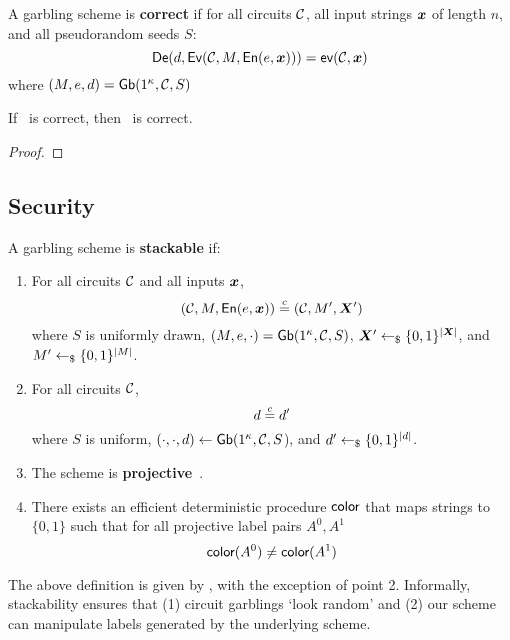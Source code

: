 \begin{definition}[Correctness]\label{def:correct}
  A garbling scheme is \textbf{correct} if for
  all circuits $\mathcal C$,
  all input strings $\cirinp$ of length $n$,
  and all pseudorandom seeds $S$:
  \[
    \gDe(d, \gEv(\cir, \mat,\gEn(e,\cirinp))) = \gev(\cir,\cirinp)
  \]
  where $(M, e, d) = \textsf{Gb}(1^\kappa,\mathcal C,S)$
\end{definition}

\begin{theorem}\label{theorem:correctness}
  If \underscheme\ is correct, then \ourscheme\ is correct.
\end{theorem}
\begin{proof}
\end{proof}

\subsection{Security}

\begin{definition}[Stackability]\label{def:stackable}
  A garbling scheme is \textbf{stackable} if:
  \begin{enumerate}
    \item
      For
      all circuits $\mathcal C$
      and all inputs $\cirinp$,
      \[
        (\cir, \mat, \gEn(e, \cirinp)) \indist (\cir, \mat', \gcirinp')
      \]
      where
      $S$ is uniformly drawn,
      $(M, e, \cdot) = \textsf{Gb}(1^\kappa, \mathcal C, S)$,
      $\gcirinp' \drawnfrom{} \{0, 1\}^{|\gcirinp|}$,
      and $M' \gets_{\$} \{0, 1\}^{|M|}$.
    \item
      For all circuits $\mathcal C$,
      \[
        d \overset{c}{=} d'
      \]
      where
      $S$ is uniform, $(\cdot, \cdot, d) \gets \textsf{Gb}(1^\kappa, \mathcal C,
      S$),
      and $d' \gets_{\$} \{0, 1\}^{|d|}$.
    \item
      The scheme is \textbf{projective}~\cite{CCS:BelHoaRog12}.
    \item
      There exists an efficient deterministic procedure $\textsf{color}$ that maps strings to $\{0, 1\}$ such that for all projective label pairs $A^0, A^1$
      \[
        \textsf{color}(A^0) \neq \textsf{color}(A^1)
      \]
  \end{enumerate}
\end{definition}

The above definition is given by \HK, with the exception of point 2.
Informally, stackability ensures that (1) circuit garblings `look
random' and (2) our scheme can manipulate labels generated by the
underlying scheme.

